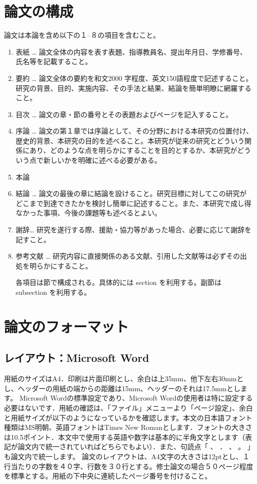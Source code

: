 \documentclass[a4paper]{jsarticle}
\begin{document}
\section{論文の構成}
論文は本論を含め以下の１--８の項目を含むこと。
\begin{enumerate}
\item 表紙 … 論文全体の内容を表す表題、指導教員名、提出年月日、学修番号、氏名等を記載すること。
\item 要約 … 論文全体の要約を和文2000 字程度、英文150語程度で記述すること。研究の背景、目的、実施内容、その手法と結果、結論を簡単明瞭に網羅すること。
\item 目次 … 論文の章・節の番号とその表題およびページを記入すること。
\item 序論 … 論文の第１章では序論として、その分野における本研究の位置付け、歴史的背景、本研究の目的を述べること。本研究が従来の研究とどういう関係にあり、どのような点を明らかにすることを目的とするか、本研究がどういう点で新しいかを明確に述べる必要がある。
\item 本論
\item 結論 … 論文の最後の章に結論を設けること。研究目標に対してこの研究がどこまで到達できたかを検討し簡単に記述すること。また、本研究で成し得なかった事項、今後の課題等も述べるとよい。
\item 謝辞… 研究を遂行する際、援助・協力等があった場合、必要に応じて謝辞を記すこと。
\item 参考文献 … 研究内容に直接関係のある文献、引用した文献等は必ずその出処を明らかにすること。

各項目は節で構成される。具体的には section を利用する。副節は subsection を利用する。
\end{enumerate}

\section{論文のフォーマット}
\subsection{レイアウト：Microsoft Word}
用紙のサイズはA4．印刷は片面印刷とし、余白は上35mm、他下左右30mmとし、ヘッダーの用紙の端からの距離は15mm、ヘッダーのそれは17.5mmとします。
Microsoft Wordの標準設定であり、Microsoft Wordの使用者は特に設定する必要はないです．用紙の確認は、「ファイル」メニューより「ページ設定」、余白と用紙サイズが以下のようになっているかを確認します。本文の日本語フォント種類はMS明朝、英語フォントはTimes New Romanとします．フォントの大きさは10.5ポイント．本文中で使用する英語や数字は基本的に半角文字とします（表記が論文内で統一されていればどちらでもよい）．また、句読点「 、 ． 、 。 」も論文内で統一します。
論文のレイアウトは、A4文字の大きさは12ptとし、１行当たりの字数を４０字、行数を３０行とする。修士論文の場合５０ページ程度を標準とする。用紙の下中央に連続したページ番号を付けること。
\end{document}
